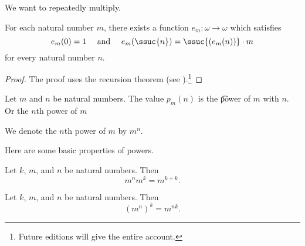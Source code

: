 

We want to repeatedly multiply.


\begin{proposition}
	For each natural number $m$, there exists a function $e_m: \omega \to \omega$ which satisfies
	\[
		e_m(0) = 1 \quad \text{ and } \quad e_m(\ssuc{n}) = \ssuc{(e_m(n))} \cdot m
	\]
	for every natural number $n$.
\end{proposition}
\begin{proof}
	The proof uses the recursion theorem (see ).\footnote{Future editions will give the entire account.}
\end{proof}
Let $m$ and $n$ be natural numbers.
The value $p_m(n)$ is the \t{power} of $m$ with $n$.
Or the \t{$n$th power of $m$}


We denote the $n$th power of $m$ by $m^n$.


Here are some basic properties of powers.

\begin{proposition}
	Let $k$, $m$, and $n$ be natural numbers. Then
	\[
		m^{n}m^{k} = m^{k + k}.
	\]
\end{proposition}

\begin{proposition}
	Let $k$, $m$, and $n$ be natural numbers. Then
	\[
		(m^{n})^k = m^{nk}.
	\]
\end{proposition}
